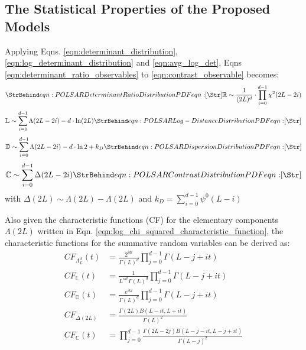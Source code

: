 \subsection{The Statistical Properties of the Proposed Models}

Applying Eqns. \ref{eqn:determinant_distribution}, \ref{eqn:log_determinant_distribution} and \ref{eqn:avg_log_det}, Eqns \ref{eqn:determinant_ratio_observables} to \ref{eqn:contrast_observable} becomes:
\begin{equation}
 \label{eqn:determinant_ratio_distribution}
 \caption{eqn:POLSAR Determinant Ratio Distribution PDF}
 \mathbb{R} \sim \frac{1}{(2L)^d} \cdot \prod_{i=0}^{d-1} \chi^2 (2L-2i) 
\end{equation}
\begin{equation}
\mathbb{L} \sim  \sum^{d-1}_{i=0} \Lambda(2L-2i) - d \cdot \ln(2L)
\label{eqn:log_determinant_distance_distribution}  
 \caption{eqn:POLSAR Log-Distance Distribution PDF}
\end{equation}
\begin{equation}
 \mathbb{D} \sim \sum^{d-1}_{i=0} \Lambda(2L-2i) - d \cdot \ln{2} + k_D
\label{eqn:dispersion_distribution}  
 \caption{eqn:POLSAR Dispersion Distribution PDF}
\end{equation}
\begin{equation}
 \mathbb{C} \sim \sum^{d-1}_{i=0} \Delta(2L-2i)
\label{eqn:contrast_distribution}  
 \caption{eqn:POLSAR Contrast Distribution PDF}
\end{equation}
with $\Delta(2L) \sim \Lambda(2L) - \Lambda(2L)$
and $k_D=\sum^{d-1}_{i=0} \psi^0(L-i)$

Also given the characteristic functions (CF) for the elementary components $\Lambda(2L)$ written in Eqn. \ref{eqn:log_chi_squared_characteristic_function}, 
  the characteristic functions for the summative random variables can be derived as:
\begin{align}
  CF_{\Lambda^d_L}(t) &= \frac{2^{idt}}{\Gamma(L)^d} \prod^{d-1}_{j=0} \Gamma(L-j+it) \\
  CF_{\mathbb{L}}(t) &= \frac{1}{L^{idt} \Gamma(L)^d} \prod^{d-1}_{j=0} \Gamma(L-j+it) \\
  CF_{\mathbb{D}}(t) &= \frac{e^{ikt}}{\Gamma(L)^d} \prod^{d-1}_{j=0} \Gamma(L-j+it) \\
  CF_{\Delta(2L)} &= \frac{\Gamma(2L) B(L-it,L+it)}{\Gamma(L)^2} \\
  CF_{\mathbb{C}}(t) &=  \prod^{d-1}_{j=0} \frac{\Gamma(2L-2j) B(L-j-it,L-j+it)}{\Gamma(L-j)^2}
\end{align}

